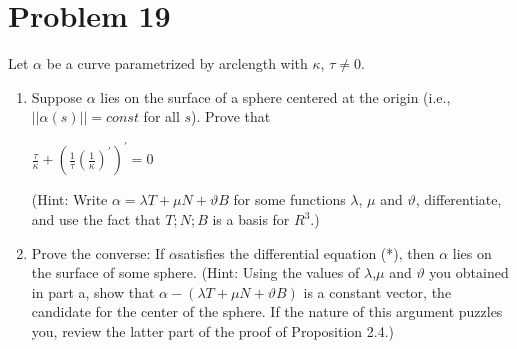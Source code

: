 \documentclass[
	12pt, %
]{fphw}
\theoremstyle{plain}
\begin{document}
\section*{Problem 19}
\begin{problem}
     Let $\alpha$ be a curve parametrized by arclength with $\kappa$, $\tau \neq 0$.\\
     \begin{enumerate} %
          \item Suppose $\alpha$ lies on the surface of a sphere centered at the origin (i.e., $||\alpha(s)|| = const$ for all $s$).
          Prove that
          \begin{center}
               $\frac{\tau}{\kappa} + (\frac{1}{\tau}(\frac{1}{\kappa})^{'})^{'} = 0$
          \end{center} 
          (Hint: Write $\alpha = \lambda T + \mu N + \vartheta B$ for some functions $\lambda$, $\mu$ and $\vartheta$, differentiate, and use the fact
           that ${T;N;B}$ is a basis for $R^{3}$.)    
          \item Prove the converse: If $\alpha$satisfies the differential equation (*), then $\alpha$ lies on the surface of some
          sphere. (Hint: Using the values of $\lambda$,$\mu$ and $\vartheta$ you obtained in part a, show that $\alpha - (\lambda T+ \mu N + \vartheta B)$
          is a constant vector, the candidate for the center of the sphere. If the nature of this argument puzzles
          you, review the latter part of the proof of Proposition 2.4.)
     \end{enumerate}

\end{problem}
\end{document}
